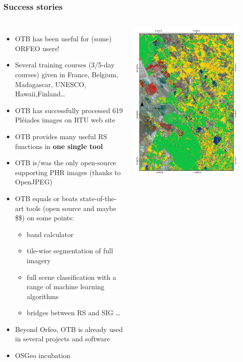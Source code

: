 \documentclass[8pt]{beamer}
\begin{document}
\begin{frame}
\frametitle{Success stories}
\begin{columns}
\begin{itemize}
\item OTB has been useful for (some) ORFEO users!
\item Several training courses (3/5-day courses) given in France, Belgium,
Madagascar, UNESCO, Hawaii,Finland\ldots
\item OTB has successfully processed 619 Pléiades
  images on RTU web site
\item OTB provides many useful RS functions in \textbf{one single tool}
\item OTB is/was the only open-source supporting PHR images (thanks to OpenJPEG)
\item OTB equals or beats state-of-the-art tools (open source and maybe \$\$) on some points:
  \begin{itemize}
  \item band calculator
  \item tile-wise segmentation of full imagery
  \item full scene classification with a range of machine learning algorithms
  \item bridges between RS and SIG \ldots
  \end{itemize}
\item Beyond Orfeo, OTB is already used in several projects and software
\item OSGeo incubation
\end{itemize}
\includegraphics[width=0.9\textwidth]{images/resultats_ird.png}\\

\end{columns}
\end{frame}
\end{document}

